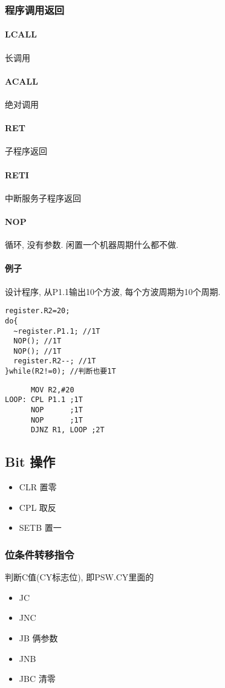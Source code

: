 \documentclass[a4paper]{report}
\begin{document}
\subsubsection{程序调用返回}
\paragraph{LCALL}长调用
\paragraph{ACALL}绝对调用
\paragraph{RET}子程序返回
\paragraph{RETI}中断服务子程序返回
\paragraph{NOP}循环, 没有参数. 闲置一个机器周期什么都不做. 
\paragraph{例子}设计程序, 从P1.1输出10个方波, 每个方波周期为10个周期. 
\begin{verbatim}
register.R2=20;
do{
  ~register.P1.1; //1T
  NOP(); //1T
  NOP(); //1T
  register.R2--; //1T
}while(R2!=0); //判断也要1T
\end{verbatim}
\begin{verbatim}
      MOV R2,#20
LOOP: CPL P1.1 ;1T
      NOP      ;1T
      NOP      ;1T
      DJNZ R1, LOOP ;2T
\end{verbatim}
\subsection{Bit 操作}
\begin{itemize}
  \item CLR 置零
  \item CPL 取反
  \item SETB 置一
\end{itemize}
\subsubsection{位条件转移指令}
判断C值(CY标志位), 即PSW.CY里面的
\begin{itemize}
  \item JC
  \item JNC
  \item JB 俩参数
  \item JNB
  \item JBC 清零
\end{itemize}
\end{document}
